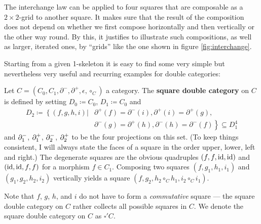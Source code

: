 The interchange law can be applied to four squares that are composable as a 
$2 \times 2$-grid to another square.
It makes sure that the result of the composition does not depend on whether we
first compose horizontally and then vertically or the other way round.
By this, it justifies to illustrate such compositions, as well as larger, iterated ones,
by ``grids'' like the one shown in figure \ref{fig:interchange}.

Starting from a given 1-skeleton it is easy to find some very simple
but nevertheless very useful and recurring examples for double categories:

\begin{example} \label{def:sq-dbl-cat}
Let $C = (C_0, C_1, \partial^-, \partial^+, \epsilon, \circ_C)$ a category. The
\textbf{square double category} on $C$ is defined by setting $D_0 \coloneqq C_0$,
$D_1 \coloneqq C_0$ and
\begin{align*}
D_2 \coloneqq \left\{ (f, g, h, i) \right| &\partial^+(f) = \partial^-(i), 
	\partial^+(i) = \partial^+(g), \\ %
	&\left.\partial^-(g) = \partial^+(h), 
	\partial^-(h) = \partial^-(f) \right\} \subseteq D_1^4
\end{align*}
and $\partial^-_1$, $\partial^+_1$, $\partial^-_2$, $\partial^+_2$ to be the four projections on
this set. (To keep things consistent, I will always state the faces of a square
in the order upper, lower, left and right.) The degenerate squares are the obvious
quadruples $(f, f, \operatorname{id}, \operatorname{id})$ and $(\operatorname{id}, \operatorname{id}, f, f)$ for a morphism $f \in C_1$.
Composing two squares $(f, g_1, h_1, i_1)$ and $(g_1, g_2, h_2, i_2)$ vertically
yields a square $(f, g_2, h_2 \circ_C h_1, i_2 \circ_C i_1)$.

Note that $f$, $g$, $h$, and $i$ do not have to form a \emph{commutative} square ---
the square double category on $C$ rather collects all possible squares in $C$.
We denote the square double category on $C$ as $\square'C$.
\end{example}

